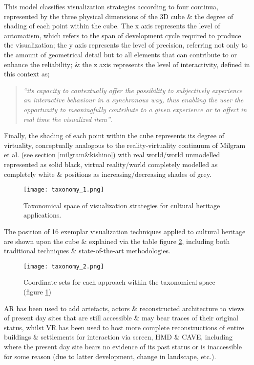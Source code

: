 This model classifies visualization strategies according to four continua, represented by the three physical dimensions of the 3D cube \& the degree of shading of each point within the cube. The x axis represents the level of automatism, which refers to the span of development cycle required to produce the visualization; the y axis represents the level of precision, referring not only to the amount of geometrical detail but to all elements that can contribute to or enhance the reliability; \& the z axis represents the level of interactivity, defined in this context as;

\begin{quote}
	\textit{``its capacity to contextually offer the possibility to subjectively experience an interactive behaviour in a synchronous way, thus enabling the user the opportunity to meaningfully contribute to a given experience or to affect in real time the visualized  item''}.
\end{quote}

Finally, the shading of each point within the cube represents its degree of virtuality, conceptually analogous to the reality-virtuality continuum of Milgram et al. (see section \ref{milgram&kishino}) with real world/world unmodelled represented as solid black, virtual reality/world completely modelled as completely white \& positions as increasing/decreasing shades of grey.

\begin{figure}[h]
\centering
  \texttt{[image: taxonomy\_1.png]}
  \caption{Taxonomical space of visualization strategies for cultural heritage applications.}
  \label{taxonomy_1.png}
\end{figure}

The position of 16 exemplar visualization techniques applied to cultural heritage are shown upon the cube \& explained via the table figure \ref{taxonomy_2.png}, including both traditional techniques \& state-of-the-art methodologies.

\begin{figure}[h]
\centering
  \texttt{[image: taxonomy\_2.png]}
  \caption{Coordinate sets for each approach within the taxonomical space (figure \ref{taxonomy_1.png})}
  \label{taxonomy_2.png}
\end{figure}


AR has been used to add artefacts, actors \& reconstructed architecture to views of present day sites that are still accessible \& may bear traces of their original status, whilst VR has been used to host more complete reconstructions of entire buildings \& settlements for interaction via screen, HMD \& CAVE, including where the present day site bears no evidence of its past status or is inaccessible for some reason (due to latter development, change in landscape, etc.).


